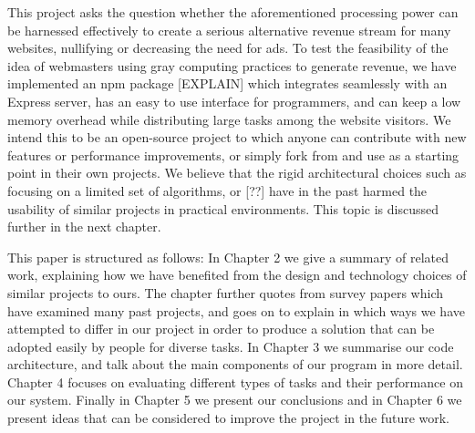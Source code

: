 
This project asks the question whether the aforementioned processing power can be harnessed effectively to create a serious alternative revenue stream for many websites, nullifying or decreasing the need for ads. To test the feasibility of the idea of webmasters using gray computing practices to generate revenue, we have implemented an npm package [EXPLAIN] which integrates seamlessly with an Express server, has an easy to use interface for programmers, and can keep a low memory overhead while distributing large tasks among the website visitors. We intend this to be an open-source project to which anyone can contribute with new features or performance improvements, or simply fork from and use as a starting point in their own projects. We believe that the rigid architectural choices such as focusing on a limited set of algorithms, or [??] have in the past harmed the usability of similar projects in practical environments. This topic is discussed further in the next chapter.

This paper is structured as follows: In Chapter 2 we give a summary of related work, explaining how we have benefited from the design and technology choices of similar projects to ours. The chapter further quotes from survey papers which have examined many past projects, and goes on to explain in which ways we have attempted to differ in our project in order to produce a solution that can be adopted easily by people for diverse tasks. In Chapter 3 we summarise our code architecture, and talk about the main components of our program in more detail. Chapter 4 focuses on evaluating different types of tasks and their performance on our system. Finally in Chapter 5 we present our conclusions and in Chapter 6 we present ideas that can be considered to improve the project in the future work.

